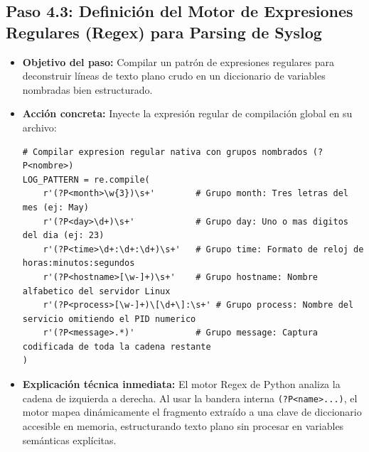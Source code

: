 \documentclass[
  coursetitle={Cómputo Nube y Tecnologías Emergentes},
  coursehours={96},
  coursedate={Verano 2026},
  doctype={Guía de Laboratorio Práctico},
  otherlangs={english,french},
  authorname={Lázaro},
  authorsurname={Bustio-Martínez},
  authortitle={PhD},
  role={Profesor Investigador},
  email={lbustio@inaoe.mx},
  phone={5559504000},
  ext={7459},
  institution={Instituto Nacional de Astrofísica, Óptica y Electrónica (INAOE)},
  department={Maestría en Ciencias en Tecnologías de Seguridad},
  address={Luis Enrique Erro 1, Sta. Ma. Tonantzintla, San Andrés Cholula, CP 72840, Puebla, México},
  margin={0.5in}
]{../../lbustio_lecture_notes}
\begin{document}
\subsection{Paso 4.3: Definición del Motor de Expresiones Regulares (Regex) para Parsing de Syslog}
\begin{itemize}
    \item \textbf{Objetivo del paso:} Compilar un patrón de expresiones regulares para deconstruir líneas de texto plano crudo en un diccionario de variables nombradas bien estructurado.
    \item \textbf{Acción concreta:} Inyecte la expresión regular de compilación global en su archivo:
\begin{verbatim}
# Compilar expresion regular nativa con grupos nombrados (?P<nombre>)
LOG_PATTERN = re.compile(
    r'(?P<month>\w{3})\s+'        # Grupo month: Tres letras del mes (ej: May)
    r'(?P<day>\d+)\s+'            # Grupo day: Uno o mas digitos del dia (ej: 23)
    r'(?P<time>\d+:\d+:\d+)\s+'   # Grupo time: Formato de reloj de horas:minutos:segundos
    r'(?P<hostname>[\w-]+)\s+'    # Grupo hostname: Nombre alfabetico del servidor Linux
    r'(?P<process>[\w-]+)\[\d+\]:\s+' # Grupo process: Nombre del servicio omitiendo el PID numerico
    r'(?P<message>.*)'            # Grupo message: Captura codificada de toda la cadena restante
)
\end{verbatim}
    \item \textbf{Explicación técnica inmediata:} El motor Regex de Python analiza la cadena de izquierda a derecha. Al usar la bandera interna \texttt{(?P<name>...)}, el motor mapea dinámicamente el fragmento extraído a una clave de diccionario accesible en memoria, estructurando texto plano sin procesar en variables semánticas explícitas.
\end{itemize}
\end{document}

